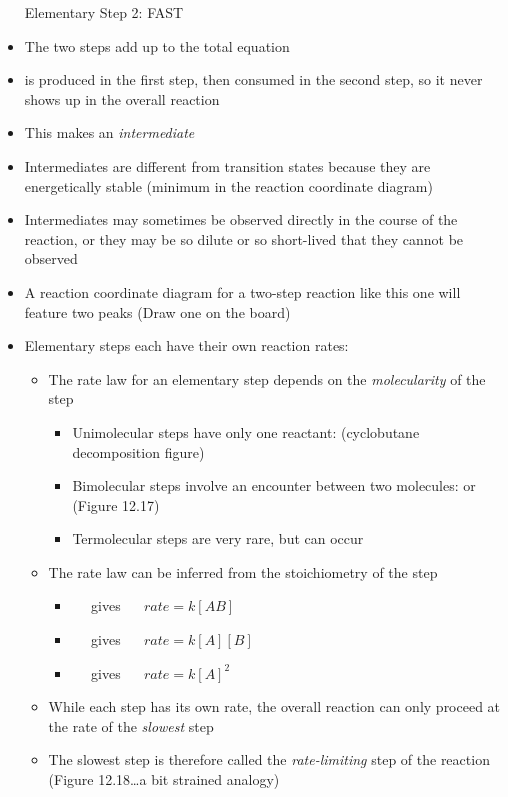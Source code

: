 \documentclass[12pt, openany, letterpaper]{memoir}
\begin{document}
\begin{itemize}
	Elementary Step 2:  \hspace{1em} FAST
	\item The two steps add up to the total equation
	\item {} is produced in the first step, then consumed in the second step, so it never shows up in the overall reaction
	\item This makes  an \emph{intermediate}
	\item Intermediates are different from transition states because they are energetically stable (minimum in the reaction coordinate diagram)
	\item Intermediates may sometimes be observed directly in the course of the reaction, or they may be so dilute or so short-lived that they cannot be observed
	\item A reaction coordinate diagram for a two-step reaction like this one will feature two peaks (Draw one on the board)
	\item Elementary steps each have their own reaction rates:
	\begin{itemize}
		\item The rate law for an elementary step depends on the \emph{molecularity} of the step
		\begin{itemize}
			\item Unimolecular steps have only one reactant:  (cyclobutane decomposition figure)
			\item Bimolecular steps involve an encounter between two molecules:  or  (Figure 12.17)
			\item Termolecular steps are very rare, but can occur
		\end{itemize}
		\item The rate law can be inferred from the stoichiometry of the step
    \begin{itemize}
			\item {} ~~ gives ~~ $rate=k\left[AB\right]$
			\item {} ~~ gives ~~ $rate=k\left[A\right]\left[B\right]$
			\item {} ~~ gives ~~ $rate=k\left[A\right]^2$
		\end{itemize}
		\item While each step has its own rate, the overall reaction can only proceed at the rate of the \emph{slowest} step
		\item The slowest step is therefore called the \emph{rate-limiting} step of the reaction (Figure 12.18\ldots a bit strained analogy)

\end{itemize}
\end{itemize}
\end{document}
